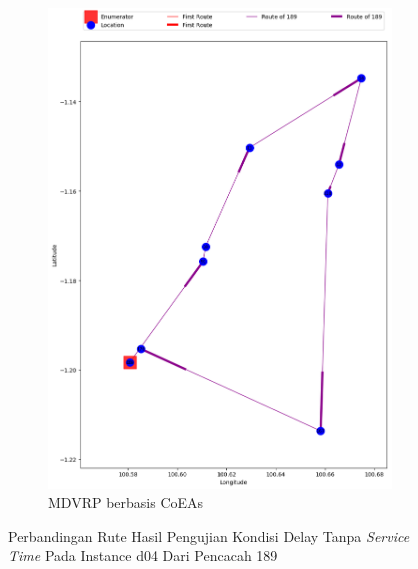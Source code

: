 \begin{figure}[H]
	\centering
	\begin{subfigure}[t]{\textwidth}
		\centering
		\includegraphics[width=\textwidth]{Resources/Images/delayed_5/real_m15_n100_delayed_5_189_coes}
		\caption{MDVRP berbasis CoEAs}
		\label{fig:real_m15_n100_delayed_5_189_coes}
	\end{subfigure}
	\caption{Perbandingan Rute Hasil Pengujian Kondisi Delay Tanpa \textit{Service Time} Pada Instance d04 Dari Pencacah 189}
	\label{fig:real_m15_n100_delayed_5_189}
\end{figure}


